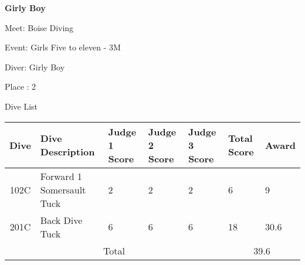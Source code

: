 \documentclass[12pt, letterpaper, landscape]{article}
\begin{document}
	\begin{center}
		\textbf{Girly Boy}
	\end{center}
	
	Meet: Boise Diving

	Event: Girls Five to eleven - 3M
	
	Diver: Girly Boy
	
	Place : 2
	
	\begin{center}
		Dive List
	\end{center}
	
	\begin{table}[h]
		\centering
			\begin{tabularx}{\textwidth}{|c X X X X X X|}
			Dive&Dive Description&Judge 1 Score&Judge 2 Score&Judge 3 Score&Total Score & Award\\\midrule
			102C&Forward 1 Somersault Tuck&2&2&2&6&9\\\midrule
201C&Back Dive Tuck&6&6&6&18&30.6\\\midrule
\midrule
			\multicolumn{5}{|c}{Total} & \multicolumn{2}{c|}{39.6}\\
		\end{tabularx}
	\end{table}
\end{document}
